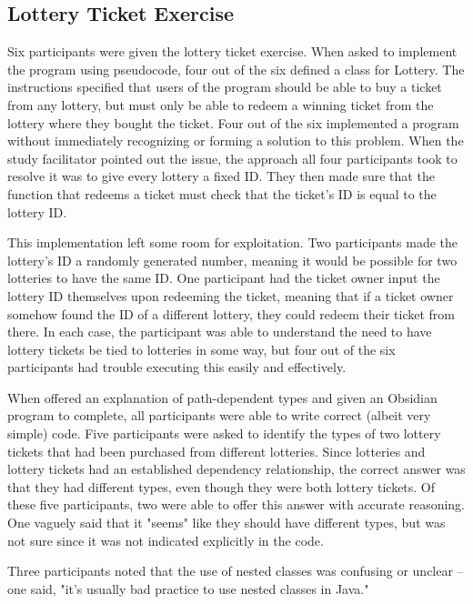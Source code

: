 \documentclass[sigplan,10pt,review]{acmart}\settopmatter{printfolios=true}
\begin{document}
\subsection{Lottery Ticket Exercise}	
	
Six participants were given the lottery ticket exercise. When asked to implement the program using pseudocode, four out of the six defined 
a class for Lottery. The instructions specified that users of the program should be able to buy a ticket from any lottery, but must only be 
able to redeem a winning ticket from the lottery where they bought the ticket. Four out of the six implemented a program without 
immediately recognizing or forming a solution to this problem. When the study facilitator pointed out the issue, the approach all four 
participants took to resolve it was to give every lottery a fixed ID. They then made sure that the function that redeems a ticket must check 
that the ticket's ID is equal to the lottery ID. 

This implementation left some room for exploitation. Two participants made the lottery's ID a randomly generated number, meaning it would be 
possible for two lotteries to have the same ID. One participant had the ticket owner input the lottery ID themselves upon redeeming 
the ticket, meaning that if a ticket owner somehow found the ID of a different lottery, they could redeem their ticket from there.
In each case, the participant was able to understand the need to have lottery tickets be tied to 
lotteries in some way, but four out of the six participants had trouble executing this easily and effectively. 

When offered an explanation of path-dependent types and given an Obsidian program to complete, all participants were able to write 
correct (albeit very simple) code. Five participants were asked to identify the types of two lottery tickets that had been purchased from different 
lotteries. Since lotteries and lottery tickets had an established dependency relationship, the correct answer was that they had different 
types, even though they were both lottery tickets. Of these five participants, two were able to offer this answer with accurate reasoning. 
One vaguely said that it "seems" like they should have different types, but was not sure since it was not indicated explicitly in the code. 

Three participants noted that the use of nested classes was confusing or unclear -- one said, "it's usually bad practice to use nested 
classes in Java."
\end{document}
